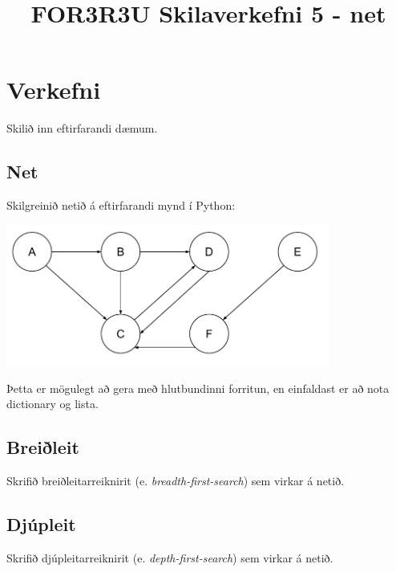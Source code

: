 \documentclass{article}
\title{FOR3R3U Skilaverkefni 5 - net}
\begin{document}
\maketitle
\section{Verkefni}
Skilið inn eftirfarandi dæmum.

\subsection{Net}

Skilgreinið netið á eftirfarandi mynd í Python:

\begin{center}
\includegraphics[width=0.8\textwidth]{Pics/Net}
\end{center}

Þetta er mögulegt að gera með hlutbundinni forritun, en einfaldast er að nota dictionary og lista.

\subsection{Breiðleit}

Skrifið breiðleitarreiknirit (e. \emph{breadth-first-search}) sem virkar á netið.

\subsection{Djúpleit}

Skrifið djúpleitarreiknirit (e. \emph{depth-first-search}) sem virkar á netið.
\end{document}
